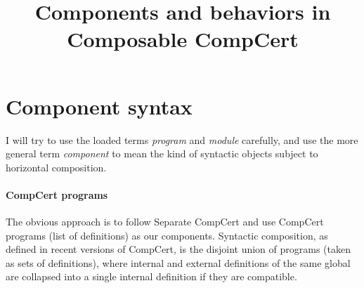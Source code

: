 \documentclass[11pt]{article}
\title{Components and behaviors in Composable CompCert}
\begin{document}
\maketitle

%
%

\section{Component syntax} %

I will try to use the loaded terms \emph{program} and \emph{module} carefully,
and use the more general term \emph{component}
to mean the kind of syntactic objects subject to horizontal composition.

\paragraph{CompCert programs} %

The obvious approach is to follow Separate CompCert and
use CompCert programs (list of definitions) as our components.
Syntactic composition, as defined in recent versions of CompCert,
is the disjoint union of programs (taken as sets of definitions),
where internal and external definitions of the same global
are collapsed into a single internal definition
if they are compatible.
\end{document}
